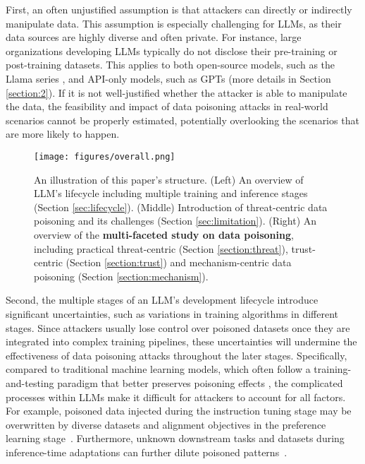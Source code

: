 First, an often unjustified assumption is that attackers can directly or indirectly manipulate data. This assumption is especially challenging for LLMs, as their data sources are highly diverse and often private. For instance, large organizations developing LLMs typically do not disclose their pre-training or post-training datasets. This applies to both open-source models, such as the Llama series \citep{dubey2024llama}, and API-only models, such as GPTs \citep{achiam2023gpt} (more details in Section \ref{section:2}). If it is not well-justified whether the attacker is able to manipulate the data, the feasibility and impact of data poisoning attacks in real-world scenarios cannot be properly estimated, potentially overlooking the scenarios that are more likely to happen. 

\begin{figure*}[t]
    \centering
    \texttt{[image: figures/overall.png]}
    \vspace{-20pt}
    \caption{An illustration of this paper's structure. (Left) An overview of LLM's lifecycle including multiple training and inference stages (Section \ref{sec:lifecycle}). (Middle) Introduction of threat-centric data poisoning and its challenges (Section \ref{sec:limitation}). (Right) An overview of the \textbf{multi-faceted study on data poisoning}, including practical threat-centric (Section \ref{section:threat}), trust-centric (Section \ref{section:trust}) and mechanism-centric data poisoning (Section \ref{section:mechanism}).}
    \label{fig:overview}
\end{figure*}

Second, the multiple stages of an LLM's development lifecycle introduce significant uncertainties, such as variations in training algorithms in different stages. Since attackers usually lose control over poisoned datasets once they are integrated into complex training pipelines, these uncertainties will undermine the effectiveness of data poisoning attacks throughout the later stages. Specifically, compared to traditional machine learning models, which often follow a training-and-testing paradigm that better preserves poisoning effects \citep{he2023sharpness}, the complicated processes within LLMs make it difficult for attackers to account for all factors. For example, poisoned data injected during the instruction tuning stage may be overwritten by diverse datasets and alignment objectives in the preference learning stage~\citep{wan2023poisoning}. Furthermore, unknown downstream tasks and datasets during inference-time adaptations can further dilute poisoned patterns~\citep{qiang2024learning}.

